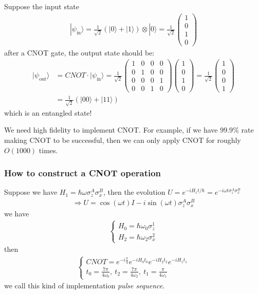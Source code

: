 \documentclass[UTF8,12pt]{article} %
\begin{document}
Suppose the input state
\begin{align}
|\psi_{\text{in}}\rangle = \frac{1}{\sqrt{2}}(|0\rangle + |1\rangle)\otimes|0\rangle = \frac{1}{\sqrt{2}}\begin{pmatrix}1\\0\\1\\0\end{pmatrix}
\end{align}
after a CNOT gate, the output state should be:
\begin{align}
|\psi_{\text{out}}\rangle &= CNOT\cdot|\psi_{\text{in}}\rangle = \frac{1}{\sqrt{2}}\begin{pmatrix}1&0&0&0\\0&1&0&0\\0&0&0&1\\0&0&1&0\end{pmatrix}\begin{pmatrix}1\\0\\1\\0\end{pmatrix} = \frac{1}{\sqrt{2}}\begin{pmatrix}1\\0\\0\\1\end{pmatrix} \\
&= \frac{1}{\sqrt{2}}(|00\rangle + |11\rangle)
\end{align}
which is an entangled state!

We need high fidelity to implement CNOT. For example, if we have $99.9\%$ rate making CNOT to be successful, then we can only apply CNOT for roughly $O(1000)$ times.

\subsubsection{How to construct a CNOT operation}
Suppose we have $H_1 =\hbar\omega\sigma_z^A\sigma_x^B$, then the evolution $U = e^{-iH_{1}t/\hbar} = e^{-i\omega t\sigma_{z}^{A}\sigma_{x}^{B}}$
\begin{align}
\Rightarrow U = \cos(\omega t)I - i\sin(\omega t)\sigma_{z}^{A}\sigma_{x}^{B}
\end{align}
we have
\begin{align}
\begin{cases}H_{0} = \hbar\omega_{0}\sigma_{z}^{1}\\H_{2} = \hbar\omega_{2}\sigma_{x}^{2}\end{cases}
\end{align}
then
\begin{align}
\begin{cases}CNOT = e^{-i\frac{\pi}{4}} e^{-iH_{0}t_{0}} e^{-iH_{2}t_{2}} e^{-iH_{1}t_{1}} \\t_{0} = \frac{7\pi}{4\omega_{0}},~t_{2} = \frac{7\pi}{4\omega_{2}},~t_{1} = \frac{\pi}{4\omega_{1}}\end{cases}
\end{align}
we call this kind of implementation \textit{pulse sequence}.
\end{document}
